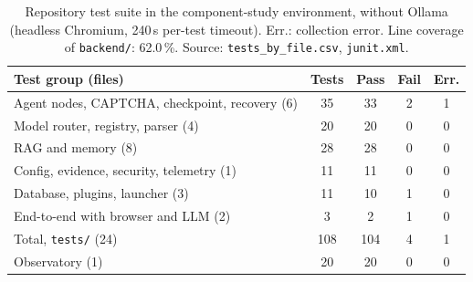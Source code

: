 \begin{table}[t]
\centering
\caption{Repository test suite in the component-study environment, without Ollama (headless Chromium, 240\,s per-test timeout). Err.: collection error. Line coverage of \texttt{backend/}: 62.0\,\%. Source: \texttt{tests\_by\_file.csv}, \texttt{junit.xml}.}
\label{tab:tests}
\footnotesize
\setlength{\tabcolsep}{3pt}
\begin{tabular}{@{}lcccc@{}}
\toprule
Test group (files) & Tests & Pass & Fail & Err. \\
\midrule
Agent nodes, CAPTCHA, checkpoint, recovery (6) & 35 & 33 & 2 & 1 \\
Model router, registry, parser (4) & 20 & 20 & 0 & 0 \\
RAG and memory (8) & 28 & 28 & 0 & 0 \\
Config, evidence, security, telemetry (1) & 11 & 11 & 0 & 0 \\
Database, plugins, launcher (3) & 11 & 10 & 1 & 0 \\
End-to-end with browser and LLM (2) & 3 & 2 & 1 & 0 \\
\midrule
Total, \texttt{tests/} (24) & 108 & 104 & 4 & 1 \\
Observatory (1) & 20 & 20 & 0 & 0 \\
\bottomrule
\end{tabular}
\end{table}
